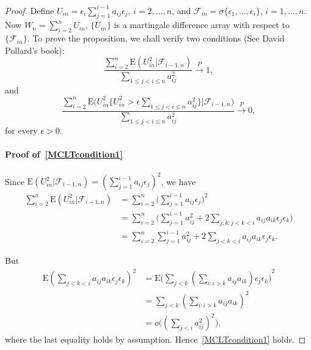 \documentclass[review]{elsarticle}
\theoremstyle{plain}
\theoremstyle{definition}
\theoremstyle{remark}
\begin{document}
 \begin{proof}
     Define $U_{in} =\epsilon_i \sum_{j=1}^{i-1} a_{ij}\epsilon_j$, $i=2,\ldots,n$, and $\mathcal{F}_{in}=\sigma\{\epsilon_1,\ldots,\epsilon_i\}$, $i=1,\ldots, n$.
     Now $W_n=\sum_{i=2}^n U_{in}$, $\{U_{in}\}$ is a martingale difference array with respect to $\{\mathcal{F}_{in}\}$. 
     To prove the proposition, we shall verify two conditions (See David Pollard's book):
     \begin{equation}\label{MCLTcondition1}
         \frac{\sum_{i=2}^n \mathrm{E}(U_{in}^2 |\mathcal{F}_{i-1,n})}{\sum_{1\leq j<i\leq n} a_{ij}^2}\xrightarrow{P} 1,
     \end{equation}
     and
     \begin{equation}\label{MCLTcondition2}
         \frac{\sum_{i=2}^n \mathrm{E}\big(U_{in}^2\big\{U_{in}^2>\epsilon \sum_{1\leq j<i\leq n} a_{ij}^2\big\}\big|\mathcal{F}_{i-1,n}\big)}{\sum_{1\leq j<i\leq n} a_{ij}^2}\xrightarrow{P} 0,
     \end{equation}
     for every $\epsilon>0$.

     \paragraph{Proof of~\eqref{MCLTcondition1}}
     Since $\mathrm{E}(U_{in}^2 |\mathcal{F}_{i-1,n})={(\sum_{j=1}^{i-1}a_{ij}\epsilon_j)}^2$, we have
     \begin{equation*}
         \begin{aligned}
\sum_{i=2}^n \mathrm{E}(U_{in}^2 |\mathcal{F}_{i-1,n})
             &=\sum_{i=2}^n \big(\sum_{j=1}^{i-1}a_{ij}\epsilon_j \big)^2\\
             &=\sum_{i=2}^n \big( \sum_{j=1}^{i-1} a_{ij}^2 +2\sum_{j,k:j<k<i} a_{ij}a_{ik}\epsilon_j \epsilon_k \big)\\
             &=\sum_{i=2}^n  \sum_{j=1}^{i-1} a_{ij}^2 +2\sum_{j<k<i} a_{ij}a_{ik}\epsilon_j \epsilon_k.
         \end{aligned}
     \end{equation*}

     But
     \begin{equation*}
         \begin{aligned}
         \mathrm{E}{(\sum_{j<k<i} a_{ij}a_{ik}\epsilon_j \epsilon_k)}^2
             &=
             \mathrm{E}{\big(\sum_{j<k} (\sum_{i:i>k}a_{ij}a_{ik})\epsilon_j \epsilon_k \big)}^2\\
             &=
             \sum_{j<k} (\sum_{i:i>k}a_{ij}a_{ik})^2\\
             &=
             o\big({(\sum_{j<i} a_{ij}^2)}^2\big),
         \end{aligned}
     \end{equation*}
     where the last equality holds by assumption. Hence~\eqref{MCLTcondition1} holds.

\end{proof}
\end{document}
